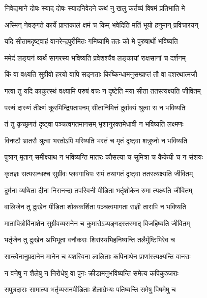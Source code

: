 \twolineshloka
{निवेद्यमाने दोषः स्याद् दोषः स्यादनिवेदने}
{कथं नु खलु कर्तव्यं विषमं प्रतिभाति मे} %

\twolineshloka
{अस्मिन् नेवङ्गते कार्ये प्राप्तकालं क्षमं च किम्}
{भवेदिति मतिं भूयो हनुमान् प्रविचारयन्} %

\twolineshloka
{यदि सीतामदृष्ट्वाहं वानरेन्द्रपुरीमितः}
{गमिष्यामि ततः को मे पुरुषार्थो भविष्यति} %

\twolineshloka
{ममेदं लङ्घनं व्यर्थं सागरस्य भविष्यति}
{प्रवेशश्चैव लङ्कायां राक्षसानां च दर्शनम्} %

\twolineshloka
{किं वा वक्ष्यति सुग्रीवो हरयो वापि सङ्गताः}
{किष्किन्धामनुसम्प्राप्तं तौ वा दशरथात्मजौ} %

\twolineshloka
{गत्वा तु यदि काकुत्स्थं वक्ष्यामि परुषं वचः}
{न दृष्टेति मया सीता ततस्त्यक्ष्यति जीवितम्} %

\twolineshloka
{परुषं दारुणं तीक्ष्णं क्रूरमिन्द्रियतापनम्}
{सीतानिमित्तं दुर्वाक्यं श्रुत्वा स न भविष्यति} %

\twolineshloka
{तं तु कृच्छ्रगतं दृष्ट्वा पञ्चत्वगतमानसम्}
{भृशानुरक्तमेधावी न भविष्यति लक्ष्मणः} %

\twolineshloka
{विनष्टौ भ्रातरौ श्रुत्वा भरतोऽपि मरिष्यति}
{भरतं च मृतं दृष्ट्वा शत्रुघ्नो न भविष्यति} %

\twolineshloka
{पुत्रान् मृतान् समीक्ष्याथ न भविष्यन्ति मातरः}
{कौसल्या च सुमित्रा च कैकेयी च न संशयः} %

\twolineshloka
{कृतज्ञः सत्यसन्धश्च सुग्रीवः प्लवगाधिपः}
{रामं तथागतं दृष्ट्वा ततस्त्यक्ष्यति जीवितम्} %

\twolineshloka
{दुर्मना व्यथिता दीना निरानन्दा तपस्विनी}
{पीडिता भर्तृशोकेन रुमा त्यक्ष्यति जीवितम्} %

\twolineshloka
{वालिजेन तु दुःखेन पीडिता शोककर्शिता}
{पञ्चत्वमागता राज्ञी तारापि न भविष्यति} %

\twolineshloka
{मातापित्रोर्विनाशेन सुग्रीवव्यसनेन च}
{कुमारोऽप्यङ्गदस्तस्माद् विजहिष्यति जीवितम्} %

\twolineshloka
{भर्तृजेन तु दुःखेन अभिभूता वनौकसः}
{शिरांस्यभिहनिष्यन्ति तलैर्मुष्टिभिरेव च} %

\twolineshloka
{सान्त्वेनानुप्रदानेन मानेन च यशस्विना}
{लालिताः कपिनाथेन प्राणांस्त्यक्ष्यन्ति वानराः} %

\twolineshloka
{न वनेषु न शैलेषु न निरोधेषु वा पुनः}
{क्रीडामनुभविष्यन्ति समेत्य कपिकुञ्जराः} %

\twolineshloka
{सपुत्रदाराः सामात्या भर्तृव्यसनपीडिताः}
{शैलाग्रेभ्यः पतिष्यन्ति समेषु विषमेषु च} %


